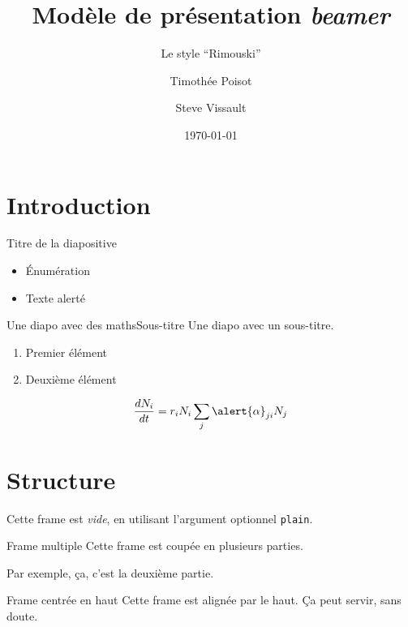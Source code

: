 \documentclass{eecslides}
\title[Modèle \emph{beamer}]{Modèle de présentation \emph{beamer}}
\subtitle{Le style ``Rimouski''}
\author[Tim \& Steve]{Timothée Poisot \and Steve Vissault}
\institute[Chaire de recherche EEC]{UQAR -- Chaire de Recherche EEC}
\date{\today}
\begin{document}
	\begin{frame}[plain]
		\titlepage
	\end{frame}

	\section{Introduction}

	\begin{frame}{Titre de la diapositive}
	    
		\begin{itemize}
			\item Énumération
			\item Texte \alert{alerté} 
		\end{itemize}
	
	\end{frame}

	\begin{frame}{Une diapo avec des maths}{Sous-titre}
		Une diapo avec un sous-titre.

		\begin{enumerate}
			\item Premier élément
			\item Deuxième élément
		\end{enumerate}

		$$\frac{dN_i}{dt} = r_iN_i\sum_j\alert{\alpha}_{ji}N_j$$

	\end{frame}

	\section{Structure}

	\begin{frame}[plain]
		Cette frame est \emph{vide}, en utilisant l'argument optionnel \texttt{plain}.
	\end{frame}

	\begin{frame}[allowframebreaks]{Frame multiple}
		Cette frame est coupée en plusieurs parties.

		\framebreak

		Par exemple, ça, c'est la deuxième partie.
	\end{frame}

	\begin{frame}[t]{Frame centrée en haut}
	    Cette frame est alignée par le haut. Ça peut servir, sans doute.	
	\end{frame}
\end{document}
